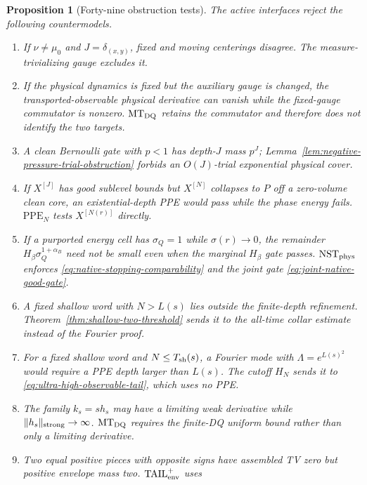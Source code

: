 \documentclass[11pt]{article}
\newtheorem{proposition}[theorem]{Proposition}
\begin{document}
\begin{proposition}[Forty-nine obstruction tests]
\label{prop:v42-obstruction-tests}
The active interfaces reject the following countermodels.
\begin{enumerate}[label=\textup{(T\arabic*)}]
\item If $\nu\ne\mu_0$ and $J=\delta_{(x,y)}$, fixed and moving
      centerings disagree.  The measure-trivializing gauge excludes it.
\item If the physical dynamics is fixed but the auxiliary gauge is changed,
      the transported-observable physical derivative can vanish while the
      fixed-gauge commutator is nonzero.  $\mathrm{MT}_{\rm DQ}$ retains the
      commutator and therefore does not identify the two targets.
\item A clean Bernoulli gate with $p<1$ has depth-$J$ mass $p^J$;
      Lemma~\ref{lem:negative-pressure-trial-obstruction} forbids an
      $O(J)$-trial exponential physical cover.
\item If $X^{[J]}$ has good sublevel bounds but $X^{[N]}$ collapses to $P$
      off a zero-volume clean core, an existential-depth PPE would pass while
      the phase energy fails.  $\mathrm{PPE}_{N}$ tests $X^{[N(r)]}$
      directly.
\item If a purported energy cell has $\sigma_Q=1$ while
      $\sigma(r)\to0$, the remainder
      $H_\beta\sigma_Q^{1+\alpha_B}$ need not be small even when the
      marginal $H_\beta$ gate passes.  $\mathrm{NST}_{\rm phys}$ enforces
      \eqref{eq:native-stopping-comparability} and the joint gate
      \eqref{eq:joint-native-good-gate}.
\item A fixed shallow word with $N>L(s)$ lies outside the finite-depth
      refinement.  Theorem~\ref{thm:shallow-two-threshold} sends it to the
      all-time collar estimate instead of the Fourier proof.
\item For a fixed shallow word and $N\le T_{\rm sh}(s)$, a Fourier mode with
      $\Lambda=e^{L(s)^2}$ would require a PPE depth larger than $L(s)$.
      The cutoff $H_N$ sends it to
      \eqref{eq:ultra-high-observable-tail}, which uses no PPE.
\item The family $k_s=s h_s$ may have a limiting weak derivative while
      $\|h_s\|_{\rm strong}\to\infty$.  $\mathrm{MT}_{\rm DQ}$
      requires the finite-DQ uniform bound rather than only a limiting
      derivative.
\item Two equal positive pieces with opposite signs have assembled TV zero
      but positive envelope mass two.  $\mathrm{TAIL}_{\rm env}^{+}$ uses

\end{enumerate}
\end{proposition}
\end{document}
